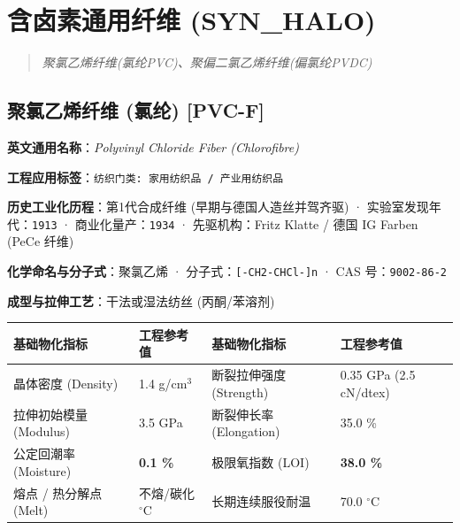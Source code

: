 \documentclass[11pt,openright,twoside,UTF8]{ctexbook}
\begin{document}
\chapter{含卤素通用纤维 (SYN\_HALO)}
\begin{quote}
\small\itshape
聚氯乙烯纤维(氯纶PVC)、聚偏二氯乙烯纤维(偏氯纶PVDC)
\end{quote}

\section{聚氯乙烯纤维 (氯纶) [PVC-F]}
\label{sec:pvc-f}

\noindent\textbf{英文通用名称}：\textit{Polyvinyl Chloride Fiber (Chlorofibre)}\par
\noindent\textbf{工程应用标签}：\texttt{纺织门类: 家用纺织品 / 产业用纺织品}\par
\noindent\textbf{历史工业化历程}：第1代合成纤维 (早期与德国人造丝并驾齐驱) · 实验室发现年代：\texttt{1913} · 商业化量产：\texttt{1934} · 先驱机构：Fritz Klatte / 德国 IG Farben (PeCe 纤维)\par
\noindent\textbf{化学命名与分子式}：聚氯乙烯 · 分子式：\texttt{[-CH2-CHCl-]n} · CAS 号：\texttt{9002-86-2}\par
\noindent\textbf{成型与拉伸工艺}：干法或湿法纺丝 (丙酮/苯溶剂)\par

\vspace{0.15cm}
\begin{center}
\small
\begin{tabularx}{\textwidth}{p{3.8cm}Xp{3.8cm}X}
\toprule
\textbf{基础物化指标} & \textbf{工程参考值} & \textbf{基础物化指标} & \textbf{工程参考值} \\
\midrule
晶体密度 (Density) & 1.4 g/cm$^3$ & 断裂拉伸强度 (Strength) & 0.35 GPa (2.5 cN/dtex) \\
拉伸初始模量 (Modulus) & 3.5 GPa & 断裂伸长率 (Elongation) & 35.0 \% \\
公定回潮率 (Moisture) & \textbf{0.1 \%} & 极限氧指数 (LOI) & \textbf{38.0 \%} \\
熔点 / 热分解点 (Melt) & 不熔/碳化 $^\circ\mathrm{C}$ & 长期连续服役耐温 & 70.0 $^\circ\mathrm{C}$ \\
\bottomrule
\end{tabularx}
\end{center}
\vspace{0.15cm}
\end{document}
